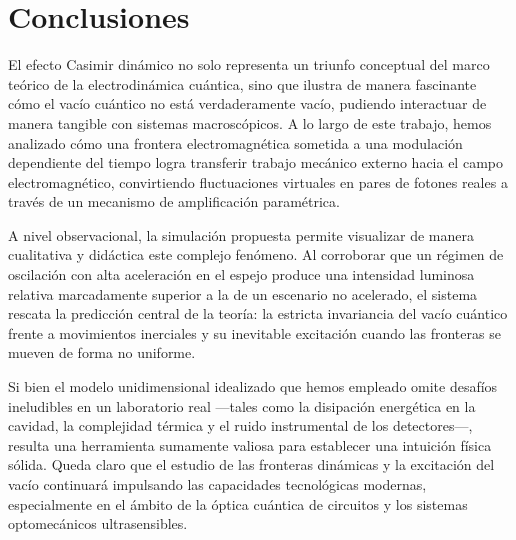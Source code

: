 \documentclass[11pt,a4paper]{article}
\begin{document}
\section{Conclusiones}

El efecto Casimir dinámico no solo representa un triunfo conceptual del marco teórico de la electrodinámica cuántica, sino que ilustra de manera fascinante cómo el vacío cuántico no está verdaderamente vacío, pudiendo interactuar de manera tangible con sistemas macroscópicos. A lo largo de este trabajo, hemos analizado cómo una frontera electromagnética sometida a una modulación dependiente del tiempo logra transferir trabajo mecánico externo hacia el campo electromagnético, convirtiendo fluctuaciones virtuales en pares de fotones reales a través de un mecanismo de amplificación paramétrica.

A nivel observacional, la simulación propuesta permite visualizar de manera cualitativa y didáctica este complejo fenómeno. Al corroborar que un régimen de oscilación con alta aceleración en el espejo produce una intensidad luminosa relativa marcadamente superior a la de un escenario no acelerado, el sistema rescata la predicción central de la teoría: la estricta invariancia del vacío cuántico frente a movimientos inerciales y su inevitable excitación cuando las fronteras se mueven de forma no uniforme.

Si bien el modelo unidimensional idealizado que hemos empleado omite desafíos ineludibles en un laboratorio real —tales como la disipación energética en la cavidad, la complejidad térmica y el ruido instrumental de los detectores—, resulta una herramienta sumamente valiosa para establecer una intuición física sólida. Queda claro que el estudio de las fronteras dinámicas y la excitación del vacío continuará impulsando las capacidades tecnológicas modernas, especialmente en el ámbito de la óptica cuántica de circuitos y los sistemas optomecánicos ultrasensibles.
\end{document}
